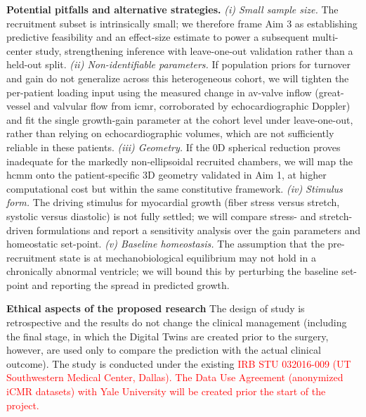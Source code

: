 \textbf{Potential pitfalls and alternative strategies.} \textit{(i) Small sample size.} The recruitment subset is intrinsically small; we therefore frame Aim 3 as establishing predictive feasibility and an effect-size estimate to power a subsequent multi-center study, strengthening inference with leave-one-out validation rather than a held-out split. \textit{(ii) Non-identifiable parameters.} If population priors for turnover and gain do not generalize across this heterogeneous cohort, we will tighten the per-patient loading input using the measured change in \gls*{av}-valve inflow (great-vessel and valvular flow from \gls*{icmr}, corroborated by echocardiographic Doppler) and fit the single growth-gain parameter at the cohort level under leave-one-out, rather than relying on echocardiographic volumes, which are not sufficiently reliable in these patients. \textit{(iii) Geometry.} If the 0D spherical reduction proves inadequate for the markedly non-ellipsoidal recruited chambers, we will map the \gls*{hcmm} onto the patient-specific 3D geometry validated in Aim 1, at higher computational cost but within the same constitutive framework. \textit{(iv) Stimulus form.} The driving stimulus for myocardial growth (fiber stress versus stretch, systolic versus diastolic) is not fully settled; we will compare stress- and stretch-driven formulations and report a sensitivity analysis over the gain parameters and homeostatic set-point. \textit{(v) Baseline homeostasis.} The assumption that the pre-recruitment state is at mechanobiological equilibrium may not hold in a chronically abnormal ventricle; we will bound this by perturbing the baseline set-point and reporting the spread in predicted growth.


\textbf{Ethical aspects of the proposed research} 
The design of study is retrospective and the results do not change the clinical management (including the final stage, in which the Digital Twins are created prior to the surgery, however, are used only to compare the prediction with the actual clinical outcome). The study is conducted under the existing \textcolor{red}{IRB STU 032016-009 (UT Southwestern Medical Center, Dallas). The Data Use Agreement (anonymized iCMR datasets) with Yale University will be created prior the start of the project. }


